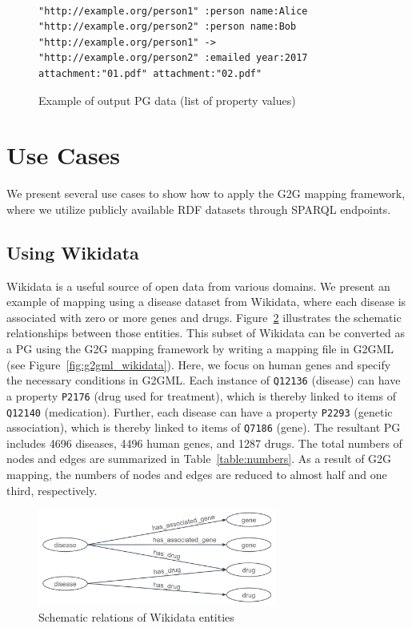 \documentclass[runningheads]{llncs}
\begin{document}
\begin{figure}[!t]
\begin{scriptsize}
\begin{verbatim}

"http://example.org/person1" :person name:Alice
"http://example.org/person2" :person name:Bob
"http://example.org/person1" -> "http://example.org/person2" :emailed year:2017 attachment:"01.pdf" attachment:"02.pdf"

\end{verbatim}
\end{scriptsize}
\caption{Example of output PG data (list of property values)}
\label{fig:example-pg3}
\end{figure}


\section{Use Cases}
 
We present several use cases to show how to apply the G2G mapping framework, where we utilize publicly available RDF datasets through SPARQL endpoints.

 
\subsection{Using Wikidata}
 
Wikidata is a useful source of open data from various domains.
We present an example of mapping using a disease dataset from Wikidata, 
where each disease is associated with zero or more genes and drugs.
Figure~\ref{fig:wikidata_schema.png} illustrates the schematic relationships between those entities. 
This subset of Wikidata can be converted as a PG using the G2G mapping framework by writing a mapping file in G2GML (see Figure~\ref{fig:g2gml_wikidata}).
Here, we focus on human genes and specify the necessary conditions in G2GML.
Each instance of \texttt{Q12136} (disease) can have a property \texttt{P2176} (drug used for treatment), which is thereby linked to items of \texttt{Q12140} (medication). Further, each disease can have a property \texttt{P2293} (genetic association), which is thereby linked to items of \texttt{Q7186} (gene).
The resultant PG includes 4696 diseases, 4496 human genes, and 1287 drugs. The total numbers of nodes and edges are summarized in Table~\ref{table:numbers}. As a result of G2G mapping, the numbers of nodes and edges are reduced to almost half and one third, respectively.
 
\begin{figure}
\center
\includegraphics[width=0.7\textwidth]{wikidata_schema.png}
\caption{Schematic relations of Wikidata entities}
\label{fig:wikidata_schema.png}
\end{figure}
 
\end{document}
